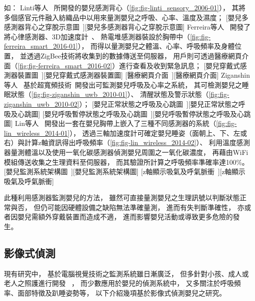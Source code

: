 \documentclass[class=NCU_thesis, crop=false]{standalone}
\begin{document}
如：
Linti等人~\cite{linti_sensory_2006}
所開發的嬰兒感測背心（\cref{fig:fig-linti_sensory_2006-01}），
其將多個感官元件融入紡織品中以用來量測嬰兒之呼吸、心率、溫度及濕度；
[嬰兒多感測器背心之穿脫示意圖~\cite{linti_sensory_2006}][嬰兒多感測器背心之穿脫示意圖]
Ferreira等人~\cite{ferreira_smart_2016}
開發了將心律感測器、3D加速度計~\cite{hung_estimation_2008, pitts_respiratory_2013, bates_respiratory_2010}、
熱電堆感測器裝設於胸帶中（\cref{fig:fig-ferreira_smart_2016-01}），
而得以量測嬰兒之體溫、心率、呼吸頻率及身體位置，
並透過ZigBee技術將收集到的數據傳送至伺服器，
用戶則可透過醫療網頁介面（\cref{fig:fig-ferreira_smart_2016-02}）進行查看及收到緊急訊息；
[嬰兒穿戴式感測器裝置圖~\cite{ferreira_smart_2016}][嬰兒穿戴式感測器裝置圖]
[醫療網頁介面~\cite{ferreira_smart_2016}][醫療網頁介面]
Ziganshin等人~\cite{ziganshin_uwb_2010}
基於超寬頻技術~\cite{staderini_uwb_2002}開發出可監測嬰兒呼吸及心率之系統，
其可檢測嬰兒之睡眠狀態（\cref{fig:fig-ziganshin_uwb_2010-01}）、
清醒狀態及警示狀態（\cref{fig:fig-ziganshin_uwb_2010-02}）；
[嬰兒正常狀態之呼吸及心跳圖~\cite{ziganshin_uwb_2010}][嬰兒正常狀態之呼吸及心跳圖]
[嬰兒呼吸暫停狀態之呼吸及心跳圖~\cite{ziganshin_uwb_2010}][嬰兒呼吸暫停狀態之呼吸及心跳圖]
Lin等人~\cite{lin_wireless_2014}
開發出一套在嬰兒胸帶上嵌入了三種不同感測器的系統（\cref{fig:fig-lin_wireless_2014-01}），
透過三軸加速度計可確定嬰兒睡姿（面朝上、下、左或右）與計算z軸資訊得出呼吸頻率（\cref{fig:fig-lin_wireless_2014-02}）、
利用溫度感測器量測體溫以及使用一氧化碳感測器偵測嬰兒周圍之一氧化碳濃度，
再藉由WiFi模組傳送收集之生理資料至伺服器，
而其驗證所計算之呼吸頻率準確率達100\%。
[嬰兒監測系統架構圖~\cite{lin_wireless_2014}][嬰兒監測系統架構圖]
[z軸顯示吸氣及呼氣脈衝~\cite{lin_wireless_2014}][z軸顯示吸氣及呼氣脈衝]

此種利用感測器監測嬰兒的方法，
雖然可直接量測嬰兒之生理訊號以判斷狀態正常與否，
但仍可能因硬體設備之缺陷無法準確量測，
進而有失判斷準確性，
亦或者因嬰兒需額外穿戴裝置而造成不適，
進而影響嬰兒活動或導致更多危險的發生。

\subsection{影像式偵測}
現有研究中，
基於電腦視覺技術之監測系統雖日漸廣泛，
但多針對小孩、成人或老人之照護進行開發
~\cite{kuo_visual_2010, yiping_detection_2006, rudovic_culturenet_2018, liu_deep_2015}，
而少數應用於嬰兒的偵測系統中，
又多關注於呼吸頻率、面部特徵及趴睡姿勢等，
以下介紹幾項基於影像式偵測嬰兒之研究。
\end{document}
